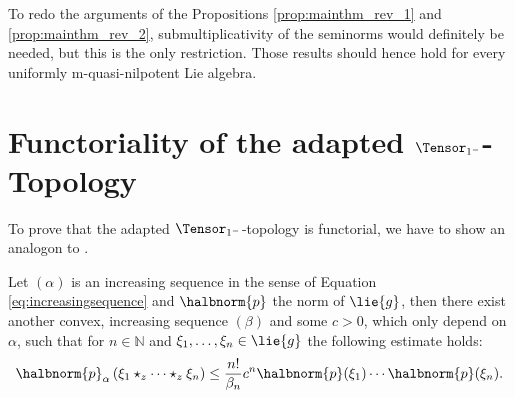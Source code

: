 \documentclass[
11pt,                          %
english                        %
]{article}
\begin{document}
To redo the arguments of the Propositions \ref{prop:mainthm_rev_1} and 
\ref{prop:mainthm_rev_2}, submultiplicativity of the seminorms would definitely be 
needed, but this is the only restriction. Those results should hence hold for every 
uniformly m-quasi-nilpotent Lie algebra.



\appendix
\section{Functoriality of the adapted $\Tensor_{1^-}$-Topology}
\label{sec:app}

To prove that the adapted $\Tensor_{1^-}$-topology is functorial, we have to show an 
analogon to \cite[Lemma 3.11]{esposito.stapor.waldmann:2015a:pre}. 
\begin{proposition}
	Let $(\alpha)$ is an increasing sequence in the sense of Equation 
	\eqref{eq:increasingsequence} and $\halbnorm{p}$ the norm of 
	$\lie{g}$, then there exist another convex, increasing sequence $(\beta)$ 
	and some $c > 0$, which only depend on $\alpha$, such that for $n \in \mathbb{N}$ 
	and $\xi_1, \ldots, \xi_n \in \lie{g}$ the following estimate holds:
	\begin{equation}
		\halbnorm{p}_\alpha
		\left(
			\xi_1 \star_z \cdots \star_z \xi_n
		\right)
		\leq
		\frac{n!}{\beta_n} c^n
		\halbnorm{p}(\xi_1) \cdots \halbnorm{p}(\xi_n).
	\end{equation}
\end{proposition}
\end{document}
